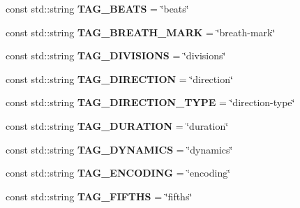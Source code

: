 \begin{DoxyCompactItemize}
\item 
\hypertarget{namespacesinsy_aecd44fd76e1c593e4aa17e6c21c1e053}{const std\-::string {\bfseries \-T\-A\-G\-\_\-\-B\-E\-A\-T\-S} = \char`\"{}beats\char`\"{}}\label{namespacesinsy_aecd44fd76e1c593e4aa17e6c21c1e053}

\item 
\hypertarget{namespacesinsy_a4663cf71e8118eddef9dd0f9336af56d}{const std\-::string {\bfseries \-T\-A\-G\-\_\-\-B\-R\-E\-A\-T\-H\-\_\-\-M\-A\-R\-K} = \char`\"{}breath-\/mark\char`\"{}}\label{namespacesinsy_a4663cf71e8118eddef9dd0f9336af56d}

\item 
\hypertarget{namespacesinsy_a42d04cbef4a5398502e55a9e823d8bca}{const std\-::string {\bfseries \-T\-A\-G\-\_\-\-D\-I\-V\-I\-S\-I\-O\-N\-S} = \char`\"{}divisions\char`\"{}}\label{namespacesinsy_a42d04cbef4a5398502e55a9e823d8bca}

\item 
\hypertarget{namespacesinsy_a4224fc6fdba17db681786e1406c6eac2}{const std\-::string {\bfseries \-T\-A\-G\-\_\-\-D\-I\-R\-E\-C\-T\-I\-O\-N} = \char`\"{}direction\char`\"{}}\label{namespacesinsy_a4224fc6fdba17db681786e1406c6eac2}

\item 
\hypertarget{namespacesinsy_aafd16668eccbee7f31d40692740e8646}{const std\-::string {\bfseries \-T\-A\-G\-\_\-\-D\-I\-R\-E\-C\-T\-I\-O\-N\-\_\-\-T\-Y\-P\-E} = \char`\"{}direction-\/type\char`\"{}}\label{namespacesinsy_aafd16668eccbee7f31d40692740e8646}

\item 
\hypertarget{namespacesinsy_a99791e491f6e89de154270cd17d1e35a}{const std\-::string {\bfseries \-T\-A\-G\-\_\-\-D\-U\-R\-A\-T\-I\-O\-N} = \char`\"{}duration\char`\"{}}\label{namespacesinsy_a99791e491f6e89de154270cd17d1e35a}

\item 
\hypertarget{namespacesinsy_a65a71880b422108d8a418e0551d1f848}{const std\-::string {\bfseries \-T\-A\-G\-\_\-\-D\-Y\-N\-A\-M\-I\-C\-S} = \char`\"{}dynamics\char`\"{}}\label{namespacesinsy_a65a71880b422108d8a418e0551d1f848}

\item 
\hypertarget{namespacesinsy_a99eb7d0ef68363e96c0a0475a7d2b4d4}{const std\-::string {\bfseries \-T\-A\-G\-\_\-\-E\-N\-C\-O\-D\-I\-N\-G} = \char`\"{}encoding\char`\"{}}\label{namespacesinsy_a99eb7d0ef68363e96c0a0475a7d2b4d4}

\item 
\hypertarget{namespacesinsy_a7d2d668f670d49f9c79eff96ee9a0552}{const std\-::string {\bfseries \-T\-A\-G\-\_\-\-F\-I\-F\-T\-H\-S} = \char`\"{}fifths\char`\"{}}\label{namespacesinsy_a7d2d668f670d49f9c79eff96ee9a0552}


\end{DoxyCompactItemize}
